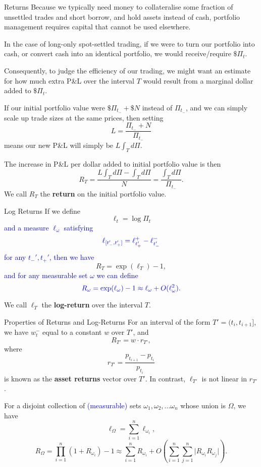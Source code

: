 \documentclass{beamer}
\begin{document}
\begin{frame}{Returns}
	Because we typically need money to collateralise some fraction of unsettled trades and short borrow, and hold assets instead of cash, portfolio management requires capital that cannot be used elsewhere.

	In the case of long-only spot-settled trading, if we were to turn our portfolio into cash, or convert cash into an identical portfolio, we would receive/require $\$\Pi_t$.

	\pause

	Consequently, to judge the efficiency of our trading, we might want an estimate for how much extra P\&L over the interval $T$ would result from a marginal dollar added to $\$\Pi_t$.

	\pause

	If our initial portfolio value were $\$\Pi_{t_-}+\$N$ instead of $\Pi_{t_-}$, and we can simply scale up trade sizes at the same prices, then setting
	$$L = \frac{\Pi_{t_-}+N}{\Pi_{t_-}}$$
	means our new P\&L will simply be $L \int_T d\Pi$.

	\pause

	The increase in P\&L per dollar added to initial portfolio value is then
	$$R_T = \frac{L \int_T d\Pi - \int_T d\Pi}{N} = \frac{\int_T d\Pi}{\Pi_{t_-}}.$$
	We call $R_T$ the \textbf{return} on the initial portfolio value.
\end{frame}

\begin{frame}{Log Returns}
	If we define
	$$\ell_t = \log \Pi_t$$ %
	\textcolor{blue}{and a measure $\ell_\omega$ satisfying}
	$$\textcolor{blue}{\ell_{[t_-',t_+']}= \ell_{t_+'}^+ - \ell_{t_-'}^-}$$
	\textcolor{blue}{for any $t_-',t_+'$, then we have}
	$$R_T = \exp(\ell_T) - 1,$$
	\textcolor{blue}{and for any measurable set $\omega$ we can define}
	$$\textcolor{blue}{R_\omega = \exp(\ell_\omega) - 1 \approx \ell_\omega + O(\ell_\omega^2).}$$

	We call $\ell_T$ the \textbf{log-return} over the interval $T$.
\end{frame}

\begin{frame}{Properties of Returns and Log-Returns}
	For an interval of the form $T' = (t_i,t_{i+1}]$, we have $w_t^-$ equal to a constant $w$ over $T'$, and
	$$R_{T'} = w \cdot r_{T'},$$
	where
	$$r_{T'} = \frac{p_{t_{i+1}} - p_{t_i}}{p_{t_i}}$$
	is known as the \textbf{asset returns} vector over $T'$. In contrast, $\ell_{T'}$ is not linear in $r_{T'}$. %

	For a disjoint collection of \textcolor{blue}{(measurable)} sets $\omega_1,\omega_2,\ldots\omega_n$ whose union is $\Omega$, we have
	$$\ell_\Omega = \sum_{i=1}^n \ell_{\omega_i},$$
	$$R_\Omega = \prod_{i=1}^n (1+R_{\omega_i}) - 1 \approx \sum_{i=1}^n R_{\omega_i} + O\left(\sum_{i=1}^n\sum_{j=1}^n \vert R_{\omega_i} R_{\omega_j} \vert\right).$$
\end{frame}
\end{document}
